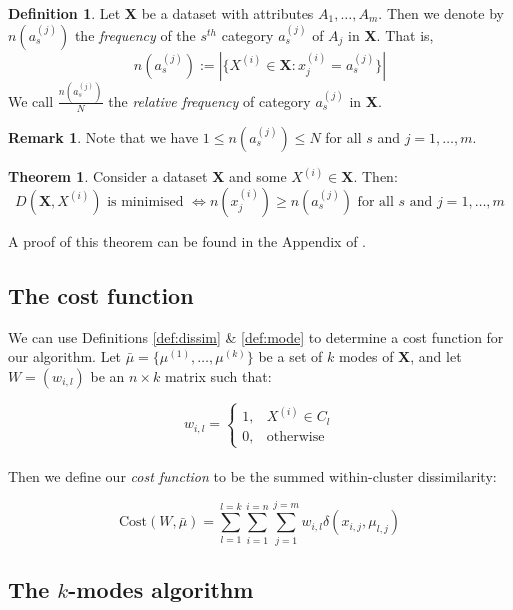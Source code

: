 \documentclass{article}
\theoremstyle{definition}
\newtheorem{definition}{Definition}[section]
\newtheorem{theorem}{Theorem}
\newtheorem*{remark}{Remark}
\begin{document}
\begin{definition}\label{def:rel-freq}
	Let \textbf{X} be a dataset with attributes $A_1, \ldots, A_m$. Then we
	denote by $n(a_s^{(j)})$ the \emph{frequency} of the $s^{th}$ category 
	$a_s^{(j)}$ of $A_j$ in \textbf{X}. That is, 
	\[
	n(a_s^{(j)}) := |{\{X^{(i)} \in \textbf{X}: x_j^{(i)} = a_s^{(j)}\}}|
	\]
	We call $\frac{n(a_s^{(j)})}{N}$ the \emph{relative frequency} of 
	category $a_s^{(j)}$ in \textbf{X}.
\end{definition}

\begin{remark}
	Note that we have $1 \le n(a_s^{(j)}) \le N$ for all $s$ and $j = 1, 
	\ldots, m$. \\
\end{remark}

\begin{theorem}\label{theorem:1}
	Consider a dataset \textbf{X} and some $X^{(i)} \in \textbf{X}$. Then:
	\[
	D(\textbf{X}, X^{(i)}) \text{ is minimised } \iff n(x_j^{(i)}) \geq 
	n(a_s^{(j)}) \text{ for all } s \text{ and } j = 1, \ldots, m 
	\]
\end{theorem}
A proof of this theorem can be found in the Appendix of \cite{Huang98}. \\


\subsection{The cost function}\label{subsection:cost}

We can use Definitions \ref{def:dissim} \& \ref{def:mode} to determine a cost 
function for our algorithm. Let $\bar{\mu} = \{\mu^{(1)}, \ldots, \mu^{(k)}\}$ 
be a set of $k$ modes of \textbf{X}, and let $W = (w_{i,l})$ be an $n \times k$
matrix such that:

\[ 
w_{i,l} = \begin{cases}
		1, & X^{(i)} \in C_l \\
                0, & \text{otherwise}
	  \end{cases}
\] \\

Then we define our \emph{cost function} to be the summed within-cluster 
dissimilarity:

\begin{equation}
\text{Cost}(W, \bar{\mu}) = \sum_{l=1}^{l=k} \sum_{i=1}^{i=n} \sum_{j=1}^{j=m} 
				w_{i,l} \delta(x_{i,j}, \mu_{l,j})
\end{equation}


\subsection{The $k$-modes algorithm}\label{subsection:kmodes}
\end{document}
